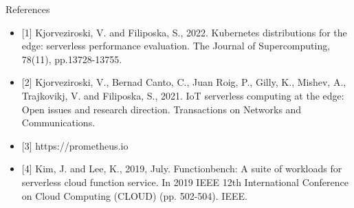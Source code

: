 \begin{frame}{References}

\begin{itemize}
    \item {[1]} Kjorveziroski, V. and Filiposka, S., 2022. Kubernetes distributions for the edge: serverless performance evaluation. The Journal of Supercomputing, 78(11), pp.13728-13755.
    \item {[2]} Kjorveziroski, V., Bernad Canto, C., Juan Roig, P., Gilly, K., Mishev, A., Trajkovikj, V. and Filiposka, S., 2021. IoT serverless computing at the edge: Open issues and research direction. Transactions on Networks and Communications.
    \item {[3]} https://prometheus.io
    \item {[4]} Kim, J. and Lee, K., 2019, July. Functionbench: A suite of workloads for serverless cloud function service. In 2019 IEEE 12th International Conference on Cloud Computing (CLOUD) (pp. 502-504). IEEE.

\end{itemize}

\end{frame}